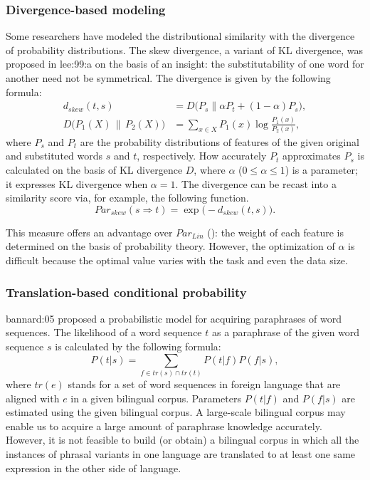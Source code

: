 \documentclass[english]{jnlp_1.4}
\renewcommand{\cite}{}
\newcommand{\newcite}{}
\begin{document}
\subsubsection{Divergence-based modeling}

Some researchers have modeled the distributional similarity with the
divergence of probability distributions.
The skew divergence, a variant of KL divergence, was proposed in
\cite{lee:99:a} on the basis of an insight: the substitutability of
one word for another need not be symmetrical.
The divergence is given by the following formula:
\begin{align*}
d_{\mathit{skew}}(t,s) &= D\bigl(P_{s}\|\alpha P_{t}+(1-\alpha)
	P_{s}\bigr),\\ 
D\bigl(P_{1}(X)\,\|\,P_{2}(X)\bigr)
	& = \sum_{x\in X}P_{1}(x)\log\frac{P_{1}(x)}{P_{2}(x)},
\end{align*}
where $P_{s}$ and $P_{t}$ are the probability distributions of
features of the given original and substituted words $s$ and $t$,
respectively.  How accurately $P_{t}$ approximates $P_{s}$ is
calculated on the basis of KL divergence $D$, where $\alpha$ ($0\leq
\alpha\leq 1$) is a parameter; it expresses KL divergence when
$\alpha=\text{1}$.
The divergence can be recast into a similarity score via, for example,
the following function.
\begin{equation}
\mathit{Par_{skew}}(s{\Rightarrow}t) =
	\exp\bigl(-d_{\mathit{skew}}(t,s)\bigr).\label{eq:skew}
\end{equation}

This measure offers an advantage over $\mathit{Par_{Lin}}$ ():
the weight of each feature is determined on the basis of probability
theory.  However, the optimization of $\alpha$ is difficult because
the optimal value varies with the task and even the data size.

\subsubsection{Translation-based conditional probability}

\newcite{bannard:05} proposed a probabilistic model for acquiring
paraphrases of word sequences.  The likelihood of a word sequence $t$
as a paraphrase of the given word sequence $s$ is calculated by the
following formula:
\[
 P(t|s) = \sum_{f\in \mathit{tr}(s)\cap
  \mathit{tr}(t)} P(t|f)P(f|s),
\]
where $\mathit{tr}(e)$ stands for a set of word sequences in foreign
language that are aligned with $e$ in a given bilingual corpus.
Parameters $P(t|f)$ and $P(f|s)$ are estimated using the given
bilingual corpus.
A large-scale bilingual corpus may enable us to acquire a large amount
of paraphrase knowledge accurately.  However, it is not feasible to
build (or obtain) a bilingual corpus in which all the instances of
phrasal variants in one language are translated to at least one same
expression in the other side of language.
\end{document}
